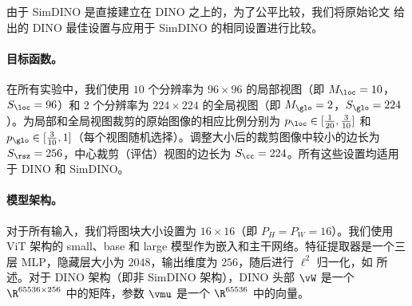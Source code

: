 \documentclass[../../book-main_zh.tex]{subfiles}
\begin{document}
由于 SimDINO 是直接建立在 DINO 之上的，为了公平比较，我们将原始论文 \citep{caron2021emerging} 给出的 DINO 最佳设置与应用于 SimDINO 的相同设置进行比较。

\paragraph{目标函数。} 在所有实验中，我们使用 \(10\) 个分辨率为 \(96 \times 96\) 的局部视图（即 \(M_{\loc} = 10\)，\(S_{\loc} = 96\)）和 \(2\) 个分辨率为 \(224 \times 224\) 的全局视图（即 \(M_{\glo} = 2\)，\(S_{\glo} = 224\)）。为局部和全局视图裁剪的原始图像的相应比例分别为 \(p_{\loc} \in [\frac{1}{20}, \frac{3}{10}]\) 和 \(p_{\glo} \in [\frac{3}{10}, 1]\)（每个视图随机选择）。调整大小后的裁剪图像中较小的边长为 \(S_{\rsz} = 256\)，中心裁剪（评估）视图的边长为 \(S_{\cc} = 224\)。所有这些设置均适用于 DINO 和 SimDINO。

\paragraph{模型架构。} 对于所有输入，我们将图块大小设置为 \(16 \times 16\)（即 \(P_{H} = P_{W} = 16\)）。我们使用 ViT \citep{dosovitskiy2020image} 架构的 small、base 和 large 模型作为嵌入和主干网络。特征提取器是一个三层 MLP，隐藏层大小为 \(2048\)，输出维度为 \(256\)，随后进行 \(\ell^{2}\) 归一化，如  所述。对于 DINO 架构（即非 SimDINO 架构），DINO 头部 \(\vW\) 是一个 \(\R^{65536 \times 256}\) 中的矩阵，参数 \(\vmu\) 是一个 \(\R^{65536}\) 中的向量。
\end{document}
